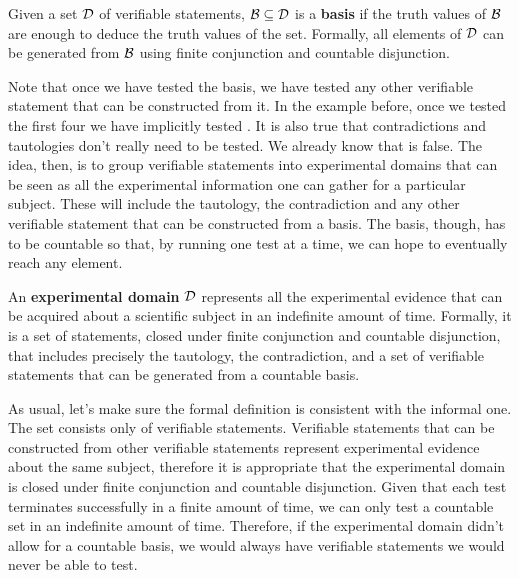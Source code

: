 \documentclass[11pt,letterpaper,fleqn]{memoir} %
\begin{document}
\begin{mathSection}
	\begin{defn}
		Given a set $\mathcal{D}$ of verifiable statements, $\mathcal{B} \subseteq \mathcal{D}$ is a \textbf{basis} if the truth values of $\mathcal{B}$ are enough to deduce the truth values of the set. Formally, all elements of $\mathcal{D}$ can be generated from $\mathcal{B}$ using finite conjunction and countable disjunction.
	\end{defn}
\end{mathSection}

Note that once we have tested the basis, we have tested any other verifiable statement that can be constructed from it. In the example before, once we tested the first four we have implicitly tested . It is also true that contradictions and tautologies don't really need to be tested. We already know that  is false. The idea, then, is to group verifiable statements into experimental domains that can be seen as all the experimental information one can gather for a particular subject. These will include the tautology, the contradiction and any other verifiable statement that can be constructed from a basis. The basis, though, has to be countable so that, by running one test at a time, we can hope to eventually reach any element.

\begin{mathSection}
\begin{defn}
	An \textbf{experimental domain} $\mathcal{D}$ represents all the experimental evidence that can be acquired about a scientific subject in an indefinite amount of time. Formally, it is a set of statements, closed under finite conjunction and countable disjunction, that includes precisely the tautology, the contradiction, and a set of verifiable statements that can be generated from a countable basis.
\end{defn}
\begin{justification}
	As usual, let's make sure the formal definition is consistent with the informal one. The set consists only of verifiable statements. Verifiable statements that can be constructed from other verifiable statements represent experimental evidence about the same subject, therefore it is appropriate that the experimental domain is closed under finite conjunction and countable disjunction. Given that each test terminates successfully in a finite amount of time, we can only test a countable set in an indefinite amount of time. Therefore, if the experimental domain didn't allow for a countable basis, we would always have verifiable statements we would never be able to test.
\end{justification}
\end{mathSection}
\end{document}
